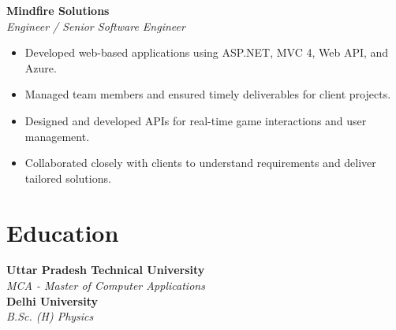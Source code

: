 \begin{tcolorbox}
\begin{minipage}[t]{0.7\textwidth}
\begin{tcolorbox}[grow to right by=0.75cm, height=0.8\textheight, colframe=white, colback=white]
                \vspace{1 em}
                \textbf{Mindfire Solutions} \hfill {} \\
                \textit{Engineer / Senior Software Engineer}  
                \begin{itemize}
                    \item Developed web-based applications using ASP.NET, MVC 4, Web API, and Azure.
                    \item Managed team members and ensured timely deliverables for client projects.
                    \item Designed and developed APIs for real-time game interactions and user management.
                    \item Collaborated closely with clients to understand requirements and deliver tailored solutions.
                \end{itemize}

                \section*{Education}

                \noindent
                \textbf{Uttar Pradesh Technical University} \\
                \textit{MCA - Master of Computer Applications} \hfill
                 \\
                
                \noindent
                \textbf{Delhi University} \\
                \textit{B.Sc. (H) Physics} \hfill
                 \\

            \end{tcolorbox}
        \end{minipage}
    \end{tcolorbox}
    

